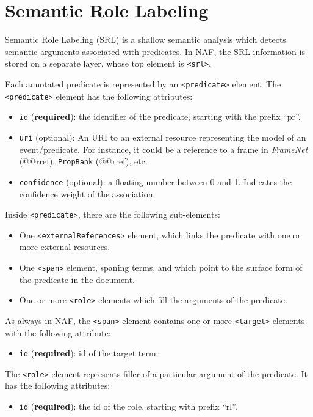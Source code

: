
\section{Semantic Role Labeling}
\label{sec:semant-role-label}

Semantic Role Labeling (SRL) is a shallow semantic analysis which detects
semantic arguments associated with predicates. In NAF, the SRL information
is stored on a separate layer, whose top element is \texttt{<srl>}.

Each annotated predicate is represented by an \texttt{<predicate>}
element. The \texttt{<predicate>} element has the following attributes:
\begin{itemize}
\item \texttt{id} (\textbf{required}): the identifier of the predicate,
  starting with the prefix ``pr''.
\item \texttt{uri} (optional): An URI to an external resource representing the model of
  an event/predicate. For instance, it could be a reference to a frame in
  \emph{FrameNet} (@@rref), \texttt{PropBank} (@@rref), etc.
\item \texttt{confidence} (optional): a floating number between 0 and
  1. Indicates the confidence weight of the association.
\end{itemize}


Inside \texttt{<predicate>}, there are the following sub-elements:
\begin{itemize}
\item One \texttt{<externalReferences>} element, which links the predicate
  with one or more external resources.
\item One \texttt{<span>} element, spaning terms, and which point to the
  surface form of the predicate in the document.
\item One or more \texttt{<role>} elements which fill the arguments of the
  predicate.
\end{itemize}

As always in NAF, the \texttt{<span>} element contains one or more
\texttt{<target>} elements with the following attribute:

\begin{itemize}
\item \texttt{id} (\textbf{required}): id of the target term.
\end{itemize}

The \texttt{<role>} element represents filler of a particular argument of
the predicate. It has the following attributes:
\begin{itemize}
\item \texttt{id} (\textbf{required}): the id of the role, starting with
  prefix ``rl''.
\end{itemize}

